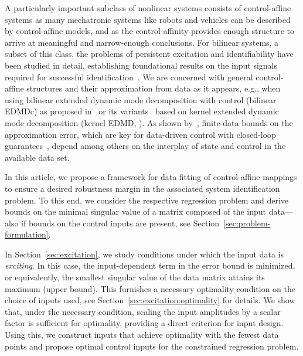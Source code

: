\documentclass[a4paper, reqno]{amsart}
\begin{document}
A particularly important subclass of nonlinear systems consists of control-affine systems as many mechatronic systems like robots and vehicles can be described by control-affine models, and as the control-affinity provides enough structure to arrive at meaningful and narrow-enough conclusions.
For bilinear systems, a subset of this class, the problems of persistent excitation and identifiability have been studied in detail, establishing foundational results on the input signals required for successful identification~\cite{Dasgupta1989,Sontag2009}.
We are concerned with general control-affine structures and their approximation from data as it appears, e.g., when using bilinear extended dynamic mode decomposition with control (bilinear EDMDc) as proposed in~\cite{surana2016koopman,peitz:otto:rowley:2020} or its variants~\cite{philipp2025error} based on kernel extended dynamic mode decomposition (kernel EDMD, \cite{klus2020kernel}).
As shown by~\cite{BoldPhil24,schimperna2025data}, finite-data bounds on the approximation error, which are key for data-driven control with closed-loop guarantees~\cite{strasser2025overview}, depend among others on the interplay of state and control in the available data set.

In this article, we propose a framework for data fitting of control-affine mappings to ensure a desired robustness margin in the associated system identification problem.
To this end, we consider the respective regression problem and derive bounds on the minimal singular value of a matrix composed of the input data---also if bounds on the control inputs are present, see Section~\ref{sec:problem-formulation}. 

In Section~\ref{sec:excitation}, we study conditions under which the input data is \emph{exciting}. In this case, the input-dependent term in the error bound is minimized, or equivalently, the smallest singular value of the data matrix attains its maximum (upper bound). 
This furnishes a necessary optimality condition on the choice of inputs used, see Section~\ref{sec:excitation:optimality} for details.
We show that, under the necessary condition, scaling the input amplitudes by a scalar factor is sufficient for optimality, providing a direct criterion for input design. Using this, we construct inputs that achieve optimality with the fewest data points and propose optimal control inputs for the constrained regression problem.
\end{document}
